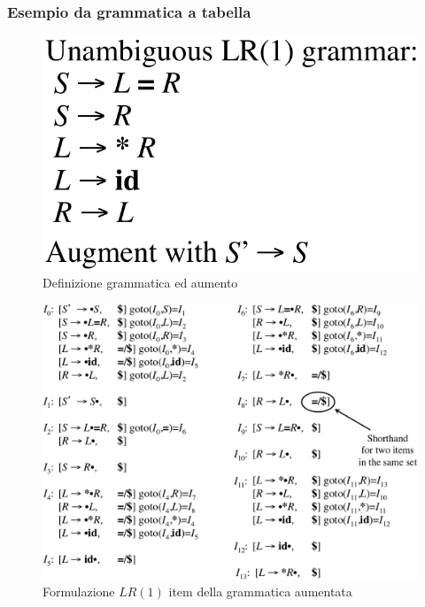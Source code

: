 \subsubsection{Esempio da grammatica a tabella}
\begin{figure}[H]
\includegraphics[scale=0.3]{res/image/ex_grammar}
\caption{Definizione grammatica ed aumento}
\label{fig:ex_grammar}
\end{figure}

\begin{figure}[H]
\centering
\includegraphics[scale=0.35]{res/image/ex_DFA}
\caption{Formulazione $LR(1)$ item della grammatica aumentata}
\label{fig:ex_DFA}
\end{figure}


